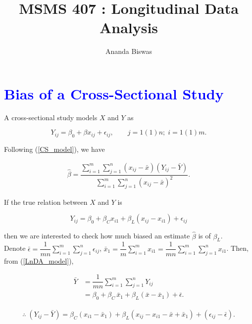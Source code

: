 \documentclass[11pt, a4paper]{article}
\title{MSMS 407 : Longitudinal Data Analysis}
\author{{\fontsize{25}{20} \benyorithafont Ananda Biswas}}
\date{}
\begin{document}
\maketitle

\section*{\faArrowAltCircleRight[regular] \textcolor{blue}{Bias of a Cross-Sectional Study}}

A cross-sectional study models $X$ and $Y$ as

\begin{equation}\label{CS_model}
Y_{ij} = \beta_0 + \beta x_{ij} + \epsilon_{ij}, \qquad j = 1(1)n; \; i = 1(1)m.
\end{equation}

Following (\ref{CS_model}), we have

\begin{align*}
\widehat{\beta}
=
\dfrac{
\sum \limits_{i=1}^{m} \sum \limits_{j=1}^{n}
(x_{ij} - \bar{x})(Y_{ij} - \bar{Y})
}{
\sum \limits_{i=1}^{m} \sum \limits_{j=1}^{n}
(x_{ij} - \bar{x})^2
}.
\end{align*}

If the true relation between $X$ and $Y$ is

\begin{equation}\label{LnDA_model}
Y_{ij} = \beta_0 + \beta_C x_{i1} + \beta_L(x_{ij} - x_{i1}) + \epsilon_{ij}
\end{equation}

then we are interested to check how much biased an estimate $\widehat{\beta}$ is of $\beta_L$. \\[0.5em]

Denote $\bar{\epsilon} = \dfrac{1}{mn} \sum \limits_{i=1}^{m} \sum \limits_{j=1}^{n} \epsilon_{ij}$, $\bar{x}_1 = \dfrac{1}{m} \sum \limits_{i=1}^{m} x_{i1} = \dfrac{1}{mn} \sum \limits_{i=1}^{m} \sum \limits_{j=1}^{n} x_{i1}$. Then, from (\ref{LnDA_model}),

\begin{align*}
\bar{Y} &= \dfrac{1}{mn} \sum \limits_{i=1}^{m} \sum \limits_{j=1}^{n} Y_{ij} \\[0.2em]
&= \beta_0 + \beta_C \,\bar{x}_1 + \beta_L \left(\bar{x} - \bar{x}_1\right) + \bar{\epsilon}.
\end{align*}

\begin{align*}
\therefore \; (Y_{ij} - \bar{Y}) = \beta_C \left(x_{i1} - \bar{x}_1 \right) + \beta_L \left(x_{ij} - x_{i1} - \bar{x} + \bar{x}_1 \right) +\left(\epsilon_{ij} - \bar{\epsilon} \right).
\end{align*}
\end{document}
